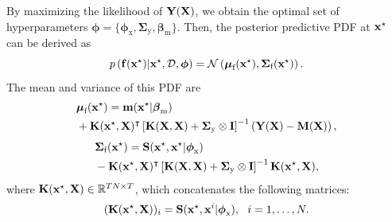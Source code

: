\documentclass[iicol,sn-basic]{sn-jnl}%
\begin{document}
\begin{appendices}
By maximizing the likelihood of ${\bf Y}({\bf X})$, we obtain the optimal set of hyperparameters $\boldsymbol \phi=\{\boldsymbol \phi_{\text{x}},\boldsymbol{\Sigma}_\text{y},\boldsymbol \beta_{\text{m}}\}$.
Then, the posterior predictive PDF at ${\bf x}^\star$ can be derived as
\begin{equation}\label{EqB4}
	p\left({\bf f}({\bf x}^\star)|{\bf x}^\star,\mathcal{D},\boldsymbol \phi\right) = \mathcal{N}\left(\boldsymbol{\mu}_\text{f}({\bf x}^\star),\boldsymbol{\Sigma}_\text{f}({\bf x}^\star)\right).
\end{equation}
The mean and variance of this PDF are
\begin{equation}\label{EqB5}
	\begin{aligned}
		& \boldsymbol{\mu}_\text{f}({\bf x}^\star)={\bf m}({\bf x}^\star|\boldsymbol \beta_{\text{m}}) \\
		& + {\bf K}({\bf x}^\star,{\bf X})^\intercal \left[ {\bf K}({\bf X},{\bf X})+\boldsymbol{\Sigma}_\text{y} \otimes {\bf I}\right]^{-1} \left({\bf Y}({\bf X})-{\bf M} ({\bf X})\right),
	\end{aligned}
\end{equation}
\begin{equation}\label{EqB6}
	\begin{aligned}
		& \boldsymbol{\Sigma}_\text{f}({\bf x}^\star)={\bf S}({\bf x}^\star,{\bf x}^\star|\boldsymbol \phi_{\text{x}})\\
		& -{\bf K}({\bf x}^\star,{\bf X})^\intercal \left[ {\bf K}({\bf X},{\bf X})+\boldsymbol{\Sigma}_\text{y} \otimes {\bf I}\right]^{-1} {\bf K}({\bf x}^\star,{\bf X}),
	\end{aligned}
\end{equation}
where ${\bf K}({\bf x}^\star,{\bf X}) \in \mathbb{R}^{TN \times T}$, which concatenates the following matrices:
\begin{equation}\label{EqB7}
	({\bf K}({\bf x}^\star,{\bf X}))_i = {\bf S}({\bf x}^\star,{\bf x}^i|\boldsymbol \phi_{\text{x}}), \ \ i=1,\dots,N.
\end{equation}
\end{appendices}

\clearpage

\end{document}
